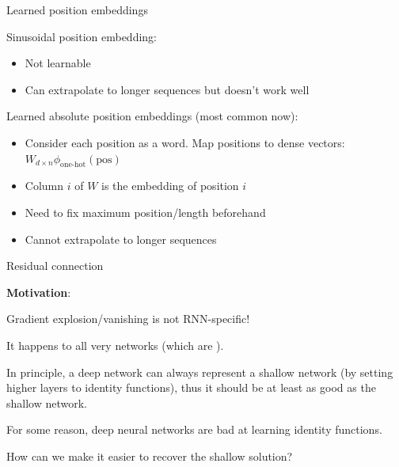 \documentclass[usenames,dvipsnames,notes,11pt,aspectratio=169,hyperref={colorlinks=true, linkcolor=blue}]{beamer}
\begin{document}
\begin{frame}
    {Learned position embeddings}

    Sinusoidal position embedding:\\
    \begin{itemize}
        \item Not learnable
        \item Can extrapolate to longer sequences but doesn't work well
    \end{itemize}
    \pause

    Learned absolute position embeddings (most common now):\\
    \begin{itemize}
        \item Consider each position as a word. Map positions to dense vectors: $W_{d\times n}\phi_{\text{one-hot}}(\text{pos})$
        \item Column $i$ of $W$ is the embedding of position $i$
            \pause
        \item Need to fix maximum position/length beforehand
        \item Cannot extrapolate to longer sequences
    \end{itemize}
\end{frame}

\begin{frame}
    {Residual connection}

    \textbf{Motivation}:\\
    \begin{wideitemize}
        \item Gradient explosion/vanishing is not RNN-specific!
        \item It happens to all very  networks (which are ).
            \pause
        \item In principle, a deep network can always represent a shallow network (by setting higher layers to identity functions), thus it should be at least as good as the shallow network.
        \item For some reason, deep neural networks are bad at learning identity functions.
        \item How can we make it easier to recover the shallow solution?
    \end{wideitemize}
\end{frame}
\end{document}
